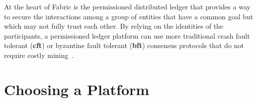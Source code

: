 At the heart of Fabric is the permissioned distributed ledger that provides a way to secure the interactions among a group of entities that have a common goal but which may not fully trust each other. By relying on the identities of the participants, a permissioned ledger platform can use more traditional crash fault tolerant (\textbf{cft}) or byzantine fault tolerant (\textbf{bft}) consensus protocols that do not require costly mining~\cite{HyperledgerFabricDocs2017}.
\section{Choosing a Platform}
